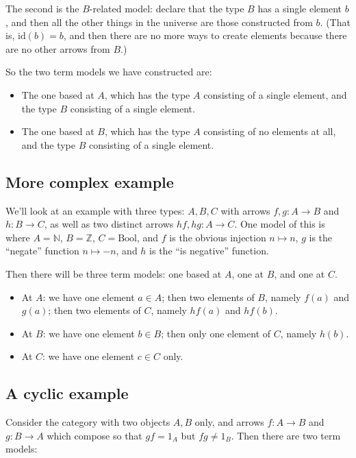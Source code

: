 \documentclass[11pt]{amsart}
\begin{document}
    The second is the $B$-related model: declare that the type $B$ has a single element $b$, and then all the other things in the universe are those constructed from $b$.
    (That is, $\mathrm{id}(b) = b$, and then there are no more ways to create elements because there are no other arrows from $B$.)

    So the two term models we have constructed are:
    \begin{itemize}
        \item The one based at $A$, which has the type $A$ consisting of a single element, and the type $B$ consisting of a single element.
        \item The one based at $B$, which has the type $A$ consisting of no elements at all, and the type $B$ consisting of a single element.
    \end{itemize}

    \subsection{More complex example}

    We'll look at an example with three types: $A, B, C$ with arrows $f, g: A \to B$ and $h : B \to C$, as well as two distinct arrows $hf, hg: A \to C$.
    One model of this is where $A = \mathbb{N}$, $B = \mathbb{Z}$, $C = \mathrm{Bool}$, and $f$ is the obvious injection $n \mapsto n$, $g$ is the ``negate'' function $n \mapsto -n$, and $h$ is the ``is negative'' function.

    Then there will be three term models: one based at $A$, one at $B$, and one at $C$.

    \begin{itemize}
        \item At $A$: we have one element $a \in A$; then two elements of $B$, namely $f(a)$ and $g(a)$; then two elements of $C$, namely $hf(a)$ and $hf(b)$.
        \item At $B$: we have one element $b \in B$; then only one element of $C$, namely $h(b)$.
        \item At $C$: we have one element $c \in C$ only.
    \end{itemize}

    \subsection{A cyclic example}

    Consider the category with two objects $A, B$ only, and arrows $f: A \to B$ and $g: B \to A$ which compose so that $gf = 1_A$ but $fg \not = 1_B$.
    Then there are two term models:
\end{document}
